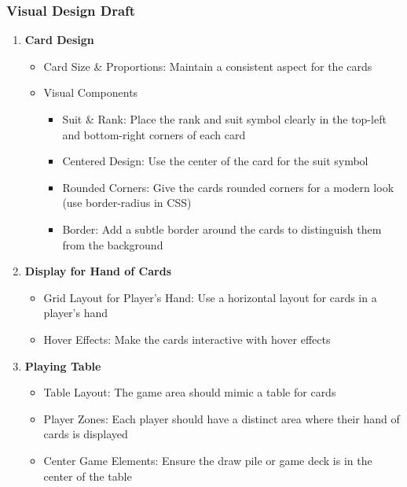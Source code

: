 \pagebreak

\subsubsection{Visual Design Draft}
\begin{enumerate}
    \item\textbf{Card Design}
    \begin{itemize}
        \item Card Size \& Proportions: Maintain a consistent aspect for the cards 
    
        \item Visual Components
        \begin{itemize}
            \item Suit \& Rank: Place the rank and suit symbol clearly in the top-left and bottom-right corners of each card
            \item Centered Design: Use the center of the card for the suit symbol
            \item Rounded Corners: Give the cards rounded corners for a modern look (use border-radius in CSS)
            \item Border: Add a subtle border around the cards to distinguish them from the background
        \end{itemize}
    \end{itemize}

    \item \textbf{Display for Hand of Cards}
    \begin{itemize}
        \item Grid Layout for Player's Hand: Use a horizontal layout for cards in a player’s hand
        \item Hover Effects: Make the cards interactive with hover effects
    \end{itemize}

    \item\textbf{Playing Table}
    \begin{itemize}
        \item Table Layout: The game area should mimic a table for cards
        \item Player Zones: Each player should have a distinct area where their hand of cards is displayed
        \item Center Game Elements: Ensure the draw pile or game deck is in the center of the table
    \end{itemize}


\end{enumerate}
